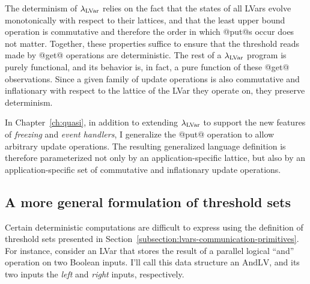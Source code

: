 The determinism of $\lambda_{\textrm{LVar}}$ relies on the fact that the states of
all LVars evolve monotonically with respect to their lattices, and
that the least upper bound operation is commutative and therefore the
order in which @put@s occur does not matter.  Together, these
properties suffice to ensure that the threshold reads made by @get@
operations are deterministic. The rest of a $\lambda_{\textrm{LVar}}$ program is
purely functional, and its behavior is, in fact, a pure function of
these @get@ observations.  Since a given family of update operations
is also commutative and inflationary with respect to the lattice of
the LVar they operate on, they preserve determinism.

In Chapter~\ref{ch:quasi}, in addition to extending $\lambda_{\textrm{LVar}}$ to
support the new features of \emph{freezing} and \emph{event handlers},
I generalize the @put@ operation to allow arbitrary update operations.
The resulting generalized language definition is therefore
parameterized not only by an application-specific lattice, but also by
an application-specific set of commutative and inflationary update
operations.


\subsection{A more general formulation of threshold sets}\label{subsection:lvars-a-more-general-formulation-of-threshold-sets}

Certain deterministic computations are difficult to express using the
definition of threshold sets presented in
Section~\ref{subsection:lvars-communication-primitives}.  For
instance, consider an LVar that stores the result of a parallel
logical ``and'' operation on two Boolean inputs.  I'll call this data
structure an $\mathrm{AndLV}$, and its two inputs the \emph{left} and
\emph{right} inputs, respectively.

